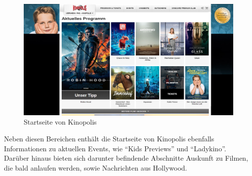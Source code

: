 	\begin{figure}
		\centering 
		\includegraphics[scale=0.38]{img/Kinopolis_MA_Start2.png}
		\captionsetup{format=hang}
		\centering\caption[Startseite von Kinopolis Viernheim]{\label{fig:Kinop.Start2}Startseite von Kinopolis\footnotemark}
	\end{figure}
	Neben diesen Bereichen enthält die Startseite von Kinopolis ebenfalls Informationen zu aktuellen Events, wie \enquote{Kids Previews} und \enquote{Ladykino}. Darüber hinaus bieten sich darunter befindende Abschnitte Auskunft zu Filmen, die bald anlaufen werden, sowie Nachrichten aus Hollywood. 
	
